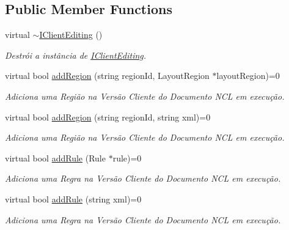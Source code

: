 \subsection*{Public Member Functions}
\begin{DoxyCompactItemize}
\item 
virtual \hyperlink{classbr_1_1ufscar_1_1lince_1_1ginga_1_1wac_1_1editing_1_1IClientEditing_a21e82d63b608e607a5618e6527cdfe23}{$\sim$IClientEditing} ()
\begin{DoxyCompactList}\small\item\em Destrói a instância de \hyperlink{classbr_1_1ufscar_1_1lince_1_1ginga_1_1wac_1_1editing_1_1IClientEditing}{IClientEditing}. \item\end{DoxyCompactList}\item 
virtual bool \hyperlink{classbr_1_1ufscar_1_1lince_1_1ginga_1_1wac_1_1editing_1_1IClientEditing_a159d8e1b676431ee5439ad932f07a6bd}{addRegion} (string regionId, LayoutRegion $\ast$layoutRegion)=0
\begin{DoxyCompactList}\small\item\em Adiciona uma Região na Versão Cliente do Documento NCL em execução. \item\end{DoxyCompactList}\item 
virtual bool \hyperlink{classbr_1_1ufscar_1_1lince_1_1ginga_1_1wac_1_1editing_1_1IClientEditing_afaa30256c70e59a36820317d203869fc}{addRegion} (string regionId, string xml)=0
\begin{DoxyCompactList}\small\item\em Adiciona uma Região na Versão Cliente do Documento NCL em execução. \item\end{DoxyCompactList}\item 
virtual bool \hyperlink{classbr_1_1ufscar_1_1lince_1_1ginga_1_1wac_1_1editing_1_1IClientEditing_abc156e111b7741a7f55c28b835614178}{addRule} (Rule $\ast$rule)=0
\begin{DoxyCompactList}\small\item\em Adiciona uma Regra na Versão Cliente do Documento NCL em execução. \item\end{DoxyCompactList}\item 
virtual bool \hyperlink{classbr_1_1ufscar_1_1lince_1_1ginga_1_1wac_1_1editing_1_1IClientEditing_a9268c1aa4301692ad9ed3c17e97d5f45}{addRule} (string xml)=0
\begin{DoxyCompactList}\small\item\em Adiciona uma Regra na Versão Cliente do Documento NCL em execução. \item\end{DoxyCompactList}\item 

\end{DoxyCompactItemize}
